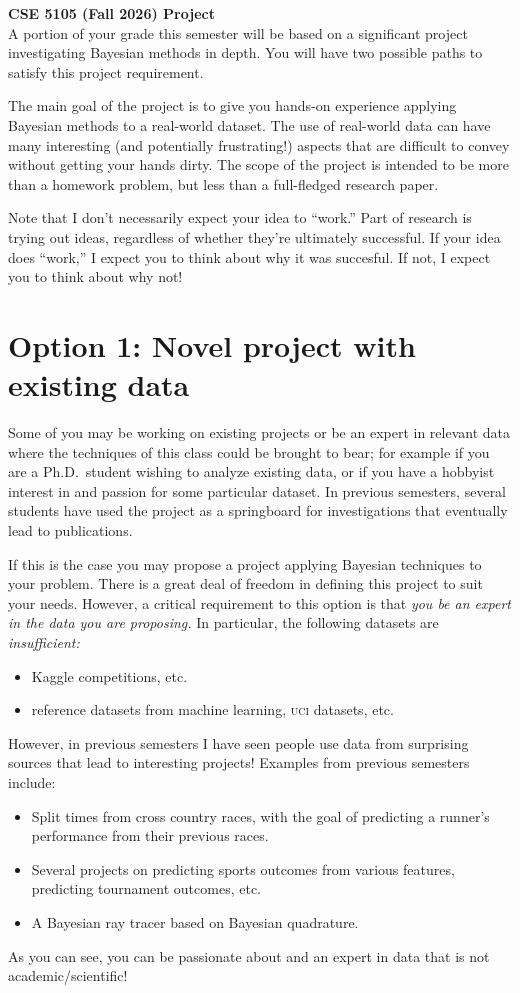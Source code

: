 \documentclass{article}
\newcommand{\acro}[1]{\textsc{\MakeLowercase{#1}}}
\begin{document}
{\large \textbf{CSE 5105 (Fall 2026) Project}} \\

A portion of your grade this semester will be based on a significant project
investigating Bayesian methods in depth. You will have two possible paths to
satisfy this project requirement.

The main goal of the project is to give you hands-on experience applying
Bayesian methods to a real-world dataset.  The use of real-world data can have
many interesting (and potentially frustrating!) aspects that are difficult to
convey without getting your hands dirty.  The scope of the project is intended
to be more than a homework problem, but less than a full-fledged research paper.

Note that I don't necessarily expect your idea to ``work.''  Part of research is
trying out ideas, regardless of whether they're ultimately successful.  If your
idea does ``work,'' I expect you to think about why it was succesful.  If not, I
expect you to think about why not!

\clearpage

\section*{Option 1: Novel project with existing data}

Some of you may be working on existing projects or be an expert in relevant data
where the techniques of this class could be brought to bear; for example if you
are a Ph.D.\ student wishing to analyze existing data, or if you have a hobbyist
interest in and passion for some particular dataset. In previous semesters,
several students have used the project as a springboard for investigations that
eventually lead to publications.

If this is the case you may propose a project applying Bayesian techniques to
your problem. There is a great deal of freedom in defining this project to suit
your needs. However, a critical requirement to this option is that \emph{you be
  an expert in the data you are proposing.} In particular, the following
datasets are \emph{insufficient:}
\begin{itemize}
\item Kaggle competitions, etc.
\item reference datasets from machine learning, \acro{UCI} datasets, etc.
\end{itemize}

However, in previous semesters I have seen people use data from surprising
sources that lead to interesting projects! Examples from previous semesters
include:
\begin{itemize}
\item Split times from cross country races, with the goal of predicting a
  runner's performance from their previous races.
\item Several projects on predicting sports outcomes from various features,
  predicting tournament outcomes, etc.
\item
  A Bayesian ray tracer based on Bayesian quadrature.
\end{itemize}
As you can see, you can be passionate about and an expert in data that is not
academic/scientific!
\end{document}
